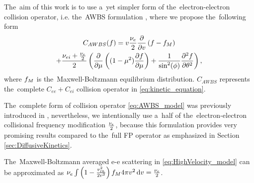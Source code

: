 The~aim of this work is to use a~yet simpler form of 
the~electron-electron collision operator, i.e. the~AWBS formulation 
\cite{AWBS_PRL1986}, where we propose the~following form
\begin{multline}
  C_{AWBS}(f) = v \frac{\nu_{e}}{2}\frac{\partial{}}{\partial{v}}\left(f - f_M\right) \\
  + \frac{\nu_{ei} + \frac{\nu_{e}}{2}}{2} 
  \left(\frac{\partial{}}{\partial{\mu}}\left((1 - \mu^2)\frac{\partial{f}}{\partial{\mu}}\right)
  + \frac{1}{\sin^2(\phi)}\frac{\partial^2f}{\partial\theta^2} \right)
  , \label{eq:AWBS_model}
\end{multline}
where $f_M$ is the~Maxwell-Boltzmann equilibrium distribution.
$C_{AWBS}$ represents the~complete $C_{ee} + C_{ei}$ collision operator in 
\eqref{eq:kinetic_equation}.

The~complete form of collision operator \eqref{eq:AWBS_model} 
was previously introduced in \cite{Sorbo_2015, Sorbo_2016}, nevertheless, 
we intentionally use a~half of the~electron-electron collisional frequency
modification $\frac{\nu_{e}}{2}$, because this formulation provides very 
promising results compared to the~full FP operator as emphasized in Section 
\ref{sec:DiffusiveKinetics}.

The~Maxwell-Boltzmann averaged e-e scattering in 
\eqref{eq:HighVelocity_model} can be approximated as 
$\nu_{e} \int\left(1 - \frac{v_{th}^2}{2v^2}\right)f_M 4\pi v^2\, \text{d}v = 
\frac{\nu_{e}}{2}$.
